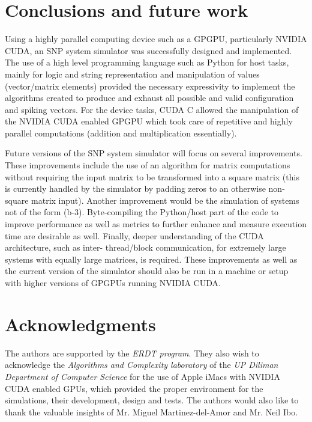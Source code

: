 \documentclass{acm_proc_article-sp}
\begin{document}
\section{Conclusions and future work}
Using a highly parallel computing device such as a GPGPU,
particularly NVIDIA CUDA, an SNP system simulator was
successfully designed and implemented. The use of a high
level programming language such as Python for host tasks,
mainly for logic and string representation and manipulation
of values (vector/matrix elements) provided the necessary
expressivity to implement the algorithms created to produce
and exhaust all possible and valid configuration and spiking
vectors. For the device tasks, CUDA C allowed the
manipulation of the NVIDIA CUDA enabled GPGPU which
took care of repetitive and highly parallel computations
(addition and multiplication essentially).

Future versions of the SNP system simulator will focus on
several improvements. These improvements include the use
of an algorithm for matrix computations without requiring
the input matrix to be transformed into a square matrix (this is
currently handled by the simulator by padding zeros to an
otherwise non-square matrix input). Another improvement
would be the simulation of systems not of the form (b-3).
Byte-compiling the Python/host part of the code to improve
performance as well as metrics to further enhance and
measure execution time are desirable as well. Finally, deeper
understanding of the CUDA architecture, such as inter-
thread/block communication, for extremely large systems
with equally large matrices, is required. These
improvements as well as the current version of the simulator
should also be run in a machine or setup with higher versions of
GPGPUs running NVIDIA CUDA.


\section{ Acknowledgments }
The authors are supported by the \textit{ERDT program}. They also wish to acknowledge the \textit{Algorithms and Complexity laboratory} of the \textit{UP Diliman Department of Computer Science} for the use of Apple iMacs with NVIDIA CUDA enabled GPUs, which provided the proper environment for the simulations, their development, design and tests. The authors would also like to thank the valuable insights of Mr. Miguel Martinez-del-Amor and Mr. Neil Ibo.
\end{document}
